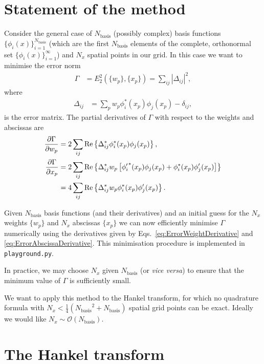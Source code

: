 \documentclass[aip,amsmath,amssymb,reprint,twocolumn]{revtex4-1}
\newcommand{\abs}[1]{\left|#1\right|}
\newcommand{\Nbasis}{{N_{\text{basis}}}}
\newcommand{\Nx}{{N_{x}}}
\DeclareMathOperator{\Real}{Re}
\begin{document}
\section{Statement of the method}
\label{sec:Method}

Consider the general case of $\Nbasis$ (possibly complex) basis functions $\{\phi_i(x)\}_{i=1}^{\Nbasis}$ (which are the first $\Nbasis$ elements of the complete, orthonormal set $\{\phi_i(x)\}_{i=1}^{\infty}$) and $\Nx$ spatial points in our grid.  In this case we want to minimise the error norm
\begin{align}
  \Gamma &= E_2^2\left(\{w_p\}, \{x_p\}\right) = \sum_{ij} \abs{\Delta_{ij}}^2, \label{eq:TransformError}
\end{align}
where
\begin{align}
  \Delta_{ij} &= \sum_{p} w_p \phi_i^*(x_p) \phi_j(x_p) - \delta_{ij},
\end{align}
is the error matrix.  The partial derivatives of $\Gamma$ with respect to the weights and abscissas are
\begin{align}
  \frac{\partial \Gamma}{\partial w_p} &= 2 \sum_{ij}\Real\left\{\Delta_{ij}^* \phi_i^*(x_p) \phi_j(x_p)\right\}, \label{eq:ErrorWeightDerivative}\\
  \frac{\partial \Gamma}{\partial x_p} &= 2 \sum_{ij}\Real\left\{\Delta_{ij}^* w_p \left[{\phi_i'}^*(x_p) \phi_j(x_p) + \phi_i^*(x_p) \phi_j'(x_p)\right] \right\} \notag\\
   &= 4 \sum_{ij}\Real\left\{\Delta_{ij}^* w_p \phi_i^*(x_p) \phi_j'(x_p)\right\}. \label{eq:ErrorAbscissaDerivative}
\end{align}

Given $\Nbasis$ basis functions (and their derivatives) and an initial guess for the $\Nx$ weights $\{w_p\}$ and $\Nx$ abscissas $\{x_p\}$ we can now efficiently minimise $\Gamma$ numerically using the derivatives given by Eqs.~\eqref{eq:ErrorWeightDerivative} and \eqref{eq:ErrorAbscissaDerivative}.  This minimisation procedure is implemented in \verb+playground.py+.

In practice, we may choose $\Nx$ given $\Nbasis$ (or \emph{vice versa}) to ensure that the minimum value of $\Gamma$ is sufficiently small.

We want to apply this method to the Hankel transform, for which no quadrature formula with $\Nx < \frac{1}{4}(\Nbasis^2 + \Nbasis)$ spatial grid points can be exact.  Ideally we would like $\Nx \sim \mathcal{O}(\Nbasis)$.

\section{The Hankel transform}
\end{document}

